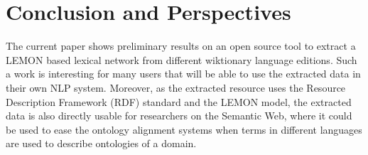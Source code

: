 \documentclass[10pt, a4paper]{article}
\begin{document}
%
%
%
%


\section{Conclusion and Perspectives}

The current paper shows preliminary results on an open source tool to extract a LEMON based lexical network from different wiktionary language editions. Such a work is interesting for many users that will be able to use the extracted data in their own NLP system. Moreover, as the extracted resource uses the Resource Description Framework (RDF) standard and the LEMON model, the extracted data is also directly usable for researchers on the Semantic Web, where it could be used to ease the ontology alignment systems when terms in different languages are used to describe ontologies of a domain.
\end{document}

